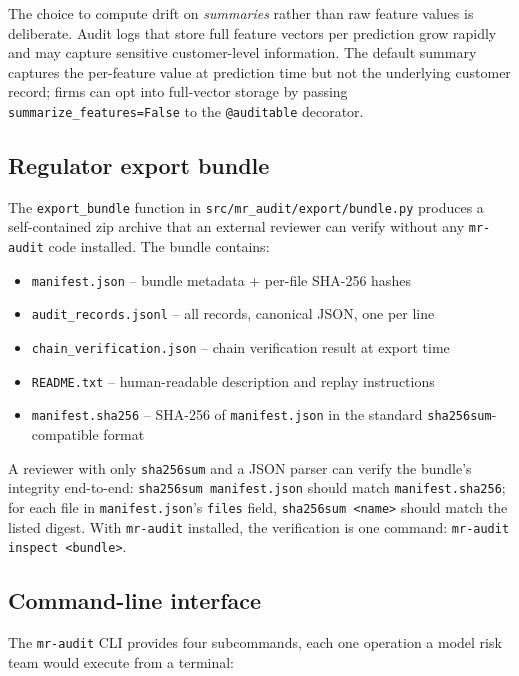The choice to compute drift on \emph{summaries} rather than raw feature values is deliberate. Audit logs that store full feature vectors per prediction grow rapidly and may capture sensitive customer-level information. The default summary captures the per-feature value at prediction time but not the underlying customer record; firms can opt into full-vector storage by passing \texttt{summarize\_features=False} to the \verb|@auditable| decorator.

\subsection{Regulator export bundle}\label{sec:export_module}

The \texttt{export\_bundle} function in \texttt{src/mr\_audit/export/bundle.py} produces a self-contained zip archive that an external reviewer can verify without any \texttt{mr-audit} code installed. The bundle contains:

\begin{itemize}[leftmargin=*]
    \item \texttt{manifest.json} -- bundle metadata + per-file SHA-256 hashes
    \item \texttt{audit\_records.jsonl} -- all records, canonical JSON, one per line
    \item \texttt{chain\_verification.json} -- chain verification result at export time
    \item \texttt{README.txt} -- human-readable description and replay instructions
    \item \texttt{manifest.sha256} -- SHA-256 of \texttt{manifest.json} in the standard \texttt{sha256sum}-compatible format
\end{itemize}

A reviewer with only \texttt{sha256sum} and a JSON parser can verify the bundle's integrity end-to-end: \texttt{sha256sum manifest.json} should match \texttt{manifest.sha256}; for each file in \texttt{manifest.json}'s \texttt{files} field, \texttt{sha256sum <name>} should match the listed digest. With \texttt{mr-audit} installed, the verification is one command: \texttt{mr-audit inspect <bundle>}.

\subsection{Command-line interface}\label{sec:cli}

The \texttt{mr-audit} CLI provides four subcommands, each one operation a model risk team would execute from a terminal:

